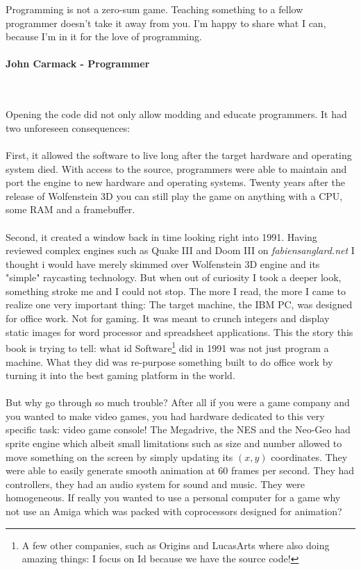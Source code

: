  \begin{fancyquotes}
   Programming is not a zero-sum game. Teaching something to a fellow programmer doesn't take it away from you. I'm happy to share what I can, because I'm in it for the love of programming.\\
   \\
\textbf{John Carmack - Programmer}
 \end{fancyquotes}\\
\\
Opening the code did not only allow modding and educate programmers. It had two unforeseen consequences:\\
\\
First, it allowed the software to live long after the target hardware and operating system died. With access to the source, programmers were able to maintain and port the engine to new hardware and operating systems. Twenty years after the release of Wolfenstein 3D you can still play the game on anything with a CPU, some RAM and a framebuffer. \\
\\
Second, it created a window back in time looking right into 1991. Having reviewed complex engines such as Quake III and Doom III on \emph{fabiensanglard.net} I thought i would have merely skimmed over Wolfenstein 3D engine and its "simple" raycasting technology. But when out of curiosity I took a deeper look, something stroke me and I could not stop. The more I read, the more I came to realize one very important thing: The target machine, the IBM PC, was designed for office work. Not for gaming. It was meant to crunch integers and display static images for word processor and spreadsheet applications. This the story this book is trying to tell: what id Software\footnote{A few other companies, such as Origins and LucasArts where also doing amazing things: I focus on Id because we have the source code!} did in 1991 was not just program a machine. What they did was re-purpose something built to do office work by turning it into the best gaming platform in the world.\\
\\
But why go through so much trouble? After all if you were a game company and you wanted to make video games, you had hardware dedicated to this very specific task: video game console! The Megadrive, the NES and the Neo-Geo had sprite engine which albeit small limitations such as size and number allowed to move something on the screen by simply updating its $(x,y)$ coordinates. They were able to easily generate smooth animation at 60 frames per second. They had controllers, they had an audio system for sound and music. They were homogeneous. If really you wanted to use a personal computer for a game why not use an Amiga which was packed with coprocessors designed for animation?\\
